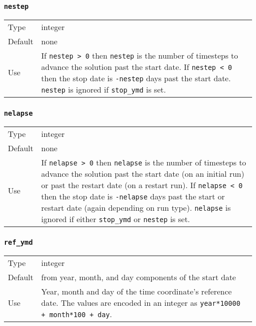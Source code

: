 \documentclass[12pt]{article}
\newcommand{\code}[1]{\texttt{#1}}
\begin{document}
\subsubsection{\code{nestep}}

\begin{tabular}{lp{5.5in}}
Type    & integer \\
Default & none \\
Use     &  
If \code{nestep > 0} then \code{nestep} is the number of timesteps to
advance the solution past the start date.  If \code{nestep < 0} then the
stop date is \code{-nestep} days past the start date.  \code{nestep} is
ignored if \code{stop\_ymd} is set.
\end{tabular}

\subsubsection{\code{nelapse}}

\begin{tabular}{lp{5.5in}}
Type    & integer \\
Default & none \\
Use     &  
If \code{nelapse > 0} then \code{nelapse} is the number of timesteps to
advance the solution past the start date (on an initial run) or past the
restart date (on a restart run).  If \code{nelapse < 0} then the stop date
is \code{-nelapse} days past the start or restart date (again depending on
run type).  \code{nelapse} is ignored if either \code{stop\_ymd} or
\code{nestep} is set.
\end{tabular}

\subsubsection{\code{ref\_ymd}}

\begin{tabular}{lp{5.5in}}
Type    & integer \\
Default & from year, month, and day components of the start date \\
Use     &  
Year, month and day of the time coordinate's reference date.  The values
are encoded in an integer as \code{year*10000 + month*100 + day}.
\end{tabular}
\end{document}
